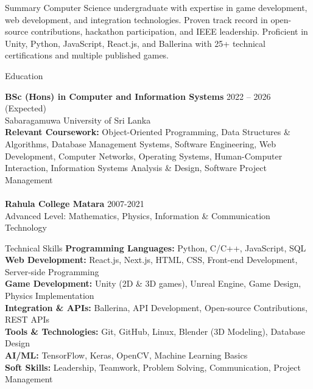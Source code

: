 \documentclass{resume} %
\begin{document}

\begin{rSection}{Summary}
Computer Science undergraduate with expertise in game development, web development, and integration technologies. Proven track record in open-source contributions, hackathon participation, and IEEE leadership. Proficient in Unity, Python, JavaScript, React.js, and Ballerina with 25+ technical certifications and multiple published games.
\end{rSection}


\begin{rSection}{Education}

{\bf BSc (Hons) in Computer and Information Systems} \hfill {2022 -- 2026 (Expected)}\\ 
Sabaragamuwa University of Sri Lanka \\
\textbf{Relevant Coursework:} Object-Oriented Programming, Data Structures \& Algorithms, Database Management Systems, Software Engineering, Web Development, Computer Networks, Operating Systems, Human-Computer Interaction, Information Systems Analysis \& Design, Software Project Management \\ \\
{\bf Rahula College Matara} \hfill {2007-2021}\\ 
Advanced Level: Mathematics, Physics, Information \& Communication Technology

\end{rSection}

\begin{rSection}{Technical Skills}
\textbf{Programming Languages:} Python, C/C++, JavaScript, SQL \\
\textbf{Web Development:} React.js, Next.js, HTML, CSS, Front-end Development, Server-side Programming \\
\textbf{Game Development:} Unity (2D \& 3D games), Unreal Engine, Game Design, Physics Implementation \\
\textbf{Integration \& APIs:} Ballerina, API Development, Open-source Contributions, REST APIs \\
\textbf{Tools \& Technologies:} Git, GitHub, Linux, Blender (3D Modeling), Database Design \\
\textbf{AI/ML:} TensorFlow, Keras, OpenCV, Machine Learning Basics \\
\textbf{Soft Skills:} Leadership, Teamwork, Problem Solving, Communication, Project Management
\end{rSection}
\end{document}
